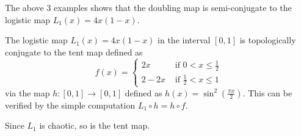 \begin{example}\label{ex_logistic_and_doubling}
	The above 3 examples shows that the doubling map is semi-conjugate to the logistic map $L_1(x) = 4x(1-x)$.
\end{example}

\begin{example}\label{ex:logistic and tent}
	The logistic map $L_1(x) = 4x(1-x)$ in the interval $[0,1]$ is topologically conjugate to the tent map defined as 
	\begin{equation}
		f(x) = 
		\begin{cases}
			2x   &\text{ if } 0<x \leq \frac{1}{2} \\ 
			2-2x &\text{ if } \frac{1}{2} < x \leq 1
		\end{cases}
	\end{equation}
	via the map $h: [0,1] \rightarrow [0,1]$ defined as $h(x) = \sin^2(\frac{\pi x}{2})$.
	This can be verified by the simple computation $L_1 \circ h = h \circ f$.

	Since $L_1$ is chaotic, so is the tent map.
\end{example}